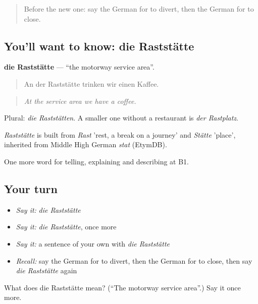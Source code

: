 \label{lesson:GE-C409-raststaette}



\begin{quote}
Before the new one: say the German for to divert, then the German for to close.
\end{quote}

\subsection*{You'll want to know: die Raststätte}
\textbf{die Raststätte} — \textquotedblleft{}the motorway service area\textquotedblright{}.

\begin{quote}
An der Raststätte trinken wir einen Kaffee.
\end{quote}

\begin{quote}
\emph{At the service area we have a coffee.}
\end{quote}

Plural: \emph{die Raststätten}. A smaller one without a restaurant is \emph{der Rastplatz}.

\begin{cousinweb}
\emph{Raststätte} is built from \emph{Rast} 'rest, a break on a journey' and \emph{Stätte} 'place', inherited from Middle High German \emph{stat} (EtymDB).
\end{cousinweb}

\begin{grammarlens}[title={What you've built}]
One more word for telling, explaining and describing at B1.
\end{grammarlens}

\subsection*{Your turn}
\begin{itemize}
\raggedright
  \item \emph{Say it:} \emph{die Raststätte}
  \item \emph{Say it:} \emph{die Raststätte}, once more
  \item \emph{Say it:} a sentence of your own with \emph{die Raststätte}
  \item \emph{Recall:} say the German for to divert, then the German for to close, then say \emph{die Raststätte} again
\end{itemize}

\begin{tcolorbox}[breakable,colback=teal!4,colframe=teal!35!black,title={Before you move on}]
What does die Raststätte mean? (\textquotedblleft{}The motorway service area\textquotedblright{}.) Say it once more.
\end{tcolorbox}
